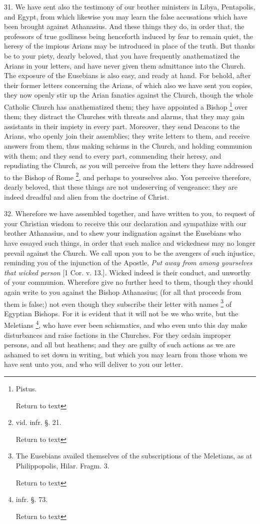 31. We have sent also the testimony of our
brother ministers in Libya, Pentapolis, and Egypt, from which likewise
you may learn the false accusations which have been brought against
Athanasius. And these things they do, in order that, the professors of
true godliness being henceforth induced by fear to remain quiet, the
heresy of the impious Arians may be introduced in place of the truth.
But thanks be to your piety, dearly beloved, that you have frequently
anathematized the Arians in your letters, and have never given them
admittance into the Church. The exposure of the Eusebians is also
easy, and ready at hand. For behold, after their former letters
concerning the Arians, of which also we have sent you copies, they now
openly stir up the Arian fanatics against the Church, though the whole
Catholic Church has anathematized them; they have appointed a Bishop \footnote{Pistus.

Return to text} over them; they distract the Churches with threats and alarms,
that they may gain assistants in their impiety in every part.
Moreover, they send Deacons to the Arians, who openly join their
assemblies; they write letters to them, and receive answers from them,
thus making schisms in the Church, and holding communion with them;
and they send to every part, commending their heresy, and repudiating
the Church, as you will perceive from the letters they have addressed
to the Bishop of Rome \footnote{vid. infr. §. 21.

Return to text},
and perhaps to yourselves also. You perceive therefore, dearly
beloved, that these things are not undeserving of vengeance: they are
indeed dreadful and alien from the doctrine of Christ.

32. Wherefore we have assembled together, and
have written to you, to request of your Christian wisdom to receive
this our declaration and sympathize with our brother Athanasius, and
to shew your indignation against the Eusebians who have essayed such
things, in order that such malice and wickedness may no longer prevail
against the Church. We call upon you to be the avengers of such
injustice, reminding you of the injunction of the Apostle, \emph{Put away
from among yourselves that wicked person} [1 Cor. v. 13.]. Wicked
indeed is their conduct, and unworthy of your communion.
Wherefore give no further heed to them, though they should again write
to you against the Bishop Athanasius; (for all that proceeds from them
is false;) not even though they subscribe their letter with names \footnote{The Eusebians availed themselves of the subscriptions of the Meletians,
as at Philippopolis, Hilar. Fragm. 3.

Return to text

} of Egyptian Bishops. For it is evident that it will not be we
who write, but the Meletians \footnote{infr. §. 73.

Return to text}, who have ever been schismatics, and who even unto this day
make disturbances and raise factions in the Churches. For they ordain
improper persons, and all but heathens; and they are guilty of such
actions as we are ashamed to set down in writing, but which you may
learn from those whom we have sent unto you, and who will deliver to
you our letter.

